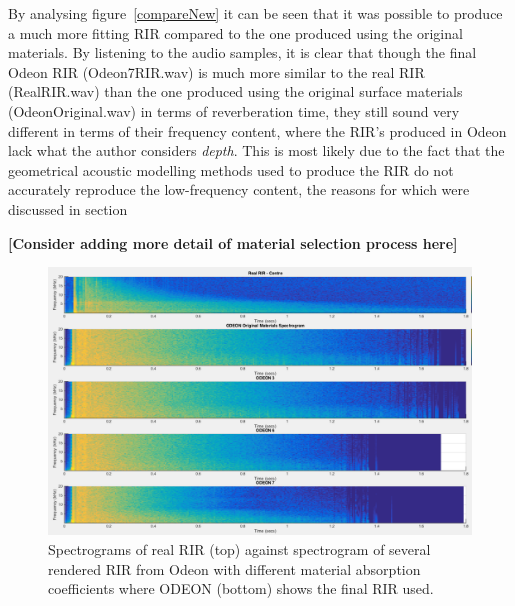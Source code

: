 \documentclass[../../main.tex]{subfiles}
\begin{document}
			By analysing figure~\ref{compareNew} it can be seen that it was possible to produce a much more fitting \ac{RIR} compared to the one produced using the original materials. By listening to the audio samples, it is clear that though the final Odeon RIR (Odeon7RIR.wav) is much more similar to the real \ac{RIR} (RealRIR.wav) than the one produced using the original surface materials (OdeonOriginal.wav) in terms of reverberation time, they still sound very different in terms of their frequency content, where the \ac{RIR}'s produced in Odeon lack what the author considers \textit{depth}. This is most likely due to the fact that the geometrical acoustic modelling methods used to produce the \ac{RIR} do not accurately reproduce the low-frequency content, the reasons for which were discussed in section~

			\begin{center}
				\textbf{[Consider adding more detail of material selection process here]}
			\end{center}

			\begin{figure}[H]
				\center\includegraphics[scale = 0.4]{Sections/Implementation/Odeon/images/MaterialCompare/OriginalMaterials/all.png}
				\caption{Spectrograms of real \ac{RIR} (top) against spectrogram of several rendered \ac{RIR} from Odeon with different material absorption coefficients where ODEON  (bottom) shows the final \ac{RIR} used.}
				\label{compareAll}
			\end{figure}
\end{document}
